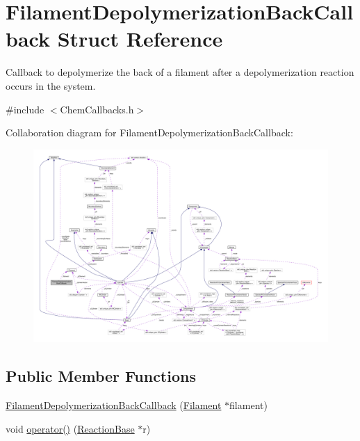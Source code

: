 \hypertarget{structFilamentDepolymerizationBackCallback}{\section{Filament\+Depolymerization\+Back\+Callback Struct Reference}
\label{structFilamentDepolymerizationBackCallback}
}


Callback to depolymerize the back of a filament after a depolymerization reaction occurs in the system.  




{\ttfamily \#include $<$Chem\+Callbacks.\+h$>$}



Collaboration diagram for Filament\+Depolymerization\+Back\+Callback\+:\nopagebreak
\begin{figure}[H]
\begin{center}
\leavevmode
\includegraphics[width=350pt]{structFilamentDepolymerizationBackCallback__coll__graph}
\end{center}
\end{figure}
\subsection*{Public Member Functions}
\begin{DoxyCompactItemize}
\item 
\hyperlink{structFilamentDepolymerizationBackCallback_a91efa0834368247e539ceb5dce45d34c}{Filament\+Depolymerization\+Back\+Callback} (\hyperlink{classFilament}{Filament} $\ast$filament)
\item 
void \hyperlink{structFilamentDepolymerizationBackCallback_a3766bd45ea6005645508cf2a96589a52}{operator()} (\hyperlink{classReactionBase}{Reaction\+Base} $\ast$r)
\end{DoxyCompactItemize}
